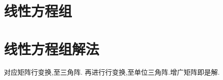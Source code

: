 \documentclass{article}
\begin{document}
        \section{线性方程组}
        \section{线性方程组解法}
        对应矩阵行变换,至三角阵.
        再进行行变换,至单位三角阵.增广矩阵即是解.
        
       

    
\end{document}
